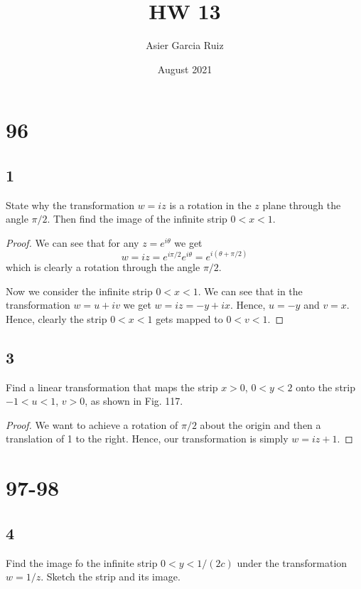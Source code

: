 \documentclass{article}
\title{HW 13}
\author{Asier Garcia Ruiz }
\date{August 2021}
\begin{document}
\maketitle

\section*{96}
\subsection*{1} %
State why the transformation $w=iz$ is a rotation in the $z$ plane through the
angle $\pi/2$. Then find the image of the infinite strip $0<x<1$.

\begin{proof}
    We can see that for any $z = e^{i\theta}$ we get
    \begin{equation*}
        w = iz = e^{i\pi/2}e^{i\theta} = e^{i(\theta + \pi/2)}
    \end{equation*}
    which is clearly a rotation through the angle $\pi/2$.

    Now we consider the infinite strip $0<x<1$. We can see that in the transformation
    $w = u + iv$ we get $w = iz = -y + ix$. Hence, $u = -y$ and $v = x$.
    Hence, clearly the strip $0<x<1$ gets mapped to $0<v<1$.
\end{proof}

\subsection*{3} %
Find a linear transformation that maps the strip $x>0$, $0<y<2$ onto the strip
$-1<u<1$, $v>0$, as shown in Fig. 117.

\begin{proof}
    We want to achieve a rotation of $\pi/2$ about the origin and then a
    translation of 1 to the right. Hence, our transformation is simply
    $w = iz + 1$.
\end{proof}

\section*{97-98}
\subsection*{4} %
Find the image fo the infinite strip $0<y<1/(2c)$ under the transformation
$w = 1/z$. Sketch the strip and its image.
\end{document}
